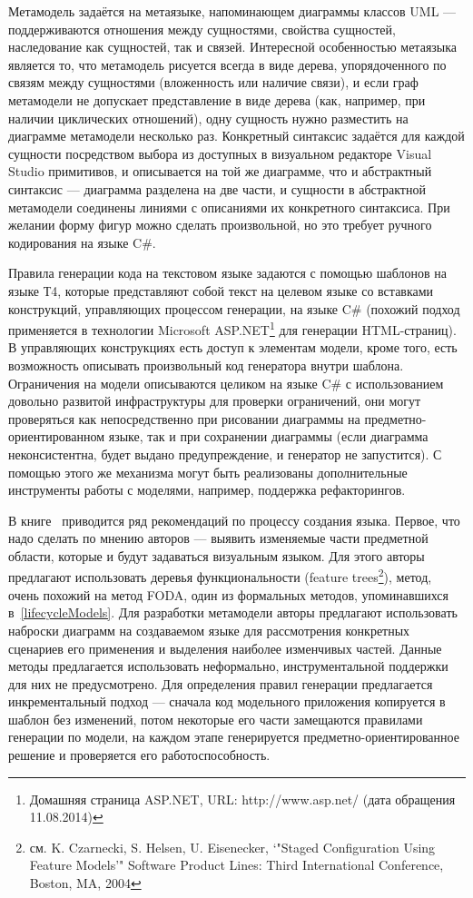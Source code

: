 Метамодель задаётся на метаязыке, напоминающем диаграммы классов UML --- поддерживаются
отношения между сущностями, свойства сущностей, наследование как сущностей, так и связей.
Интересной особенностью метаязыка является то, что метамодель рисуется всегда в виде дерева,
упорядоченного по связям между сущностями (вложенность или наличие связи), и если граф метамодели
не допускает представление в виде дерева (как, например, при наличии циклических отношений),
одну сущность нужно разместить на диаграмме метамодели несколько раз. Конкретный синтаксис
задаётся для каждой сущности посредством выбора из доступных в визуальном редакторе Visual Studio
примитивов, и описывается на той же диаграмме, что и абстрактный синтаксис --- диаграмма
разделена на две части, и сущности в абстрактной метамодели соединены линиями с описаниями их конкретного синтаксиса.
При желании форму фигур можно сделать произвольной, но это требует ручного кодирования на языке C\#.

Правила генерации кода на текстовом языке задаются с помощью шаблонов на языке Т4, которые
представляют собой текст на целевом языке со вставками конструкций, управляющих процессом 
генерации, на языке C\# (похожий подход применяется в технологии Microsoft ASP.NET\footnote
{Домашняя страница ASP.NET, URL: http://www.asp.net/ (дата обращения 11.08.2014)}
для генерации HTML-страниц). В управляющих конструкциях есть доступ к элементам модели, кроме того,
есть возможность описывать произвольный код генератора внутри шаблона. Ограничения на модели
описываются целиком на языке C\# с использованием довольно развитой инфраструктуры для
проверки ограничений, они могут проверяться как непосредственно при рисовании диаграммы
на предметно-ориентированном языке, так и при сохранении диаграммы (если диаграмма 
неконсистентна, будет выдано предупреждение, и генератор не запустится). С помощью этого
же механизма могут быть реализованы дополнительные инструменты работы с моделями, например,
поддержка рефакторингов.

В книге~\cite{cook2007domain} приводится ряд рекомендаций по процессу создания языка.
Первое, что надо сделать по мнению авторов --- выявить изменяемые части предметной области,
которые и будут задаваться визуальным языком. Для этого авторы предлагают использовать
деревья функциональности (feature trees\footnote{см. K. Czarnecki, S. Helsen, U. Eisenecker, `"Staged Configuration
Using Feature Models'" Software Product Lines: Third International Conference, Boston, MA, 2004}),
метод, очень похожий на метод FODA, один из формальных методов, упоминавшихся в~\ref{lifecycleModels}.
Для разработки метамодели авторы предлагают использовать наброски диаграмм на создаваемом языке
для рассмотрения конкретных сценариев его применения и выделения наиболее изменчивых частей.
Данные методы предлагается использовать неформально, инструментальной поддержки для них не предусмотрено.
Для определения правил генерации предлагается инкрементальный подход --- сначала код модельного
приложения копируется в шаблон без изменений, потом некоторые его части замещаются правилами генерации
по модели, на каждом этапе генерируется предметно-ориентированное решение и проверяется
его работоспособность.

